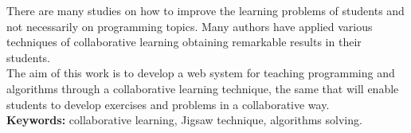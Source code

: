 There are many studies on how to improve the learning problems of students and not necessarily on programming topics. Many authors have applied various techniques of collaborative learning obtaining remarkable results in their students. \\

The aim of this work is to develop a web system for teaching programming and algorithms through a collaborative learning technique, the same that will enable students to develop exercises and problems in a collaborative way.\\

\textbf{Keywords:} collaborative learning, Jigsaw technique, algorithms solving.
